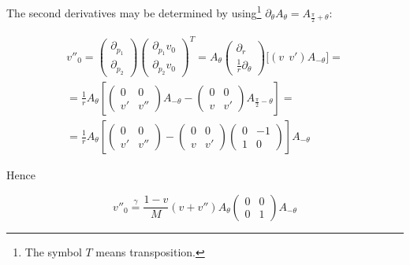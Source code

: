 \documentclass[14pt]{extarticle}
\theoremstyle{remark}
\theoremstyle{definition}
\begin{document}
The second derivatives may be determined by using\footnote{The symbol $T$ means transposition.} $\partial_\theta A_\theta=A_{\frac\pi2+\theta}$:

\begin{multline*}
	v''_0 = 
	\left(\begin{array}{c}
		\partial_{p_1}\\
		\partial_{p_2}
	\end{array}\right) 
	\left(\begin{array}{c}
		\partial_{p_1} v_0\\
		\partial_{p_2} v_0
	\end{array}\right)^T=
	A_\theta
	\left(\begin{array}{c}
		\partial_{r}\\
		\frac1r\partial_{\theta}
	\end{array}\right)
	\big[
		(v\ \ v')A_{-\theta}
	\big] = \\
	=\frac1r A_\theta
	\left[
		\left(\begin{array}{cc}
			0&0\\v'&v''
		\end{array}\right)A_{-\theta}-
		\left(\begin{array}{cc}
			0&0\\v&v'
		\end{array}\right)A_{\frac\pi2-\theta}
	\right] =\\
	= \frac1r A_\theta
	\left[
		\left(\begin{array}{cc}
			0&0\\v'&v''
		\end{array}\right)-
		\left(\begin{array}{cc}
			0&0\\v&v'
		\end{array}\right)
		\left(\begin{array}{cc}
			0&-1\\1&0
		\end{array}\right)
	\right] A_{-\theta}
\end{multline*}

\noindent Hence

\begin{equation}
\label{eq:heel_v_0_2der}
	v''_0 \stackrel{\gamma}{=} \frac{1-v}M (v+v'')
	A_\theta 
	\left(\begin{array}{cc}
		0&0\\0&1
	\end{array}\right)A_{-\theta}
\end{equation}
\end{document}
